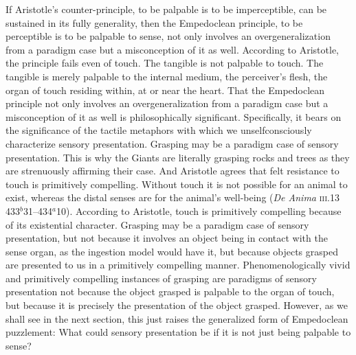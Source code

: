 If Aristotle's counter-principle, to be palpable is to be imperceptible, can be sustained in its fully generality, then the Empedoclean principle, to be perceptible is to be palpable to sense, not only involves an overgeneralization from a paradigm case but a misconception of it as well. According to Aristotle, the principle fails even of touch. The tangible is not palpable to touch. The tangible is merely palpable to the internal medium, the perceiver's flesh, the organ of touch residing within, at or near the heart. That the Empedoclean principle not only involves an overgeneralization from a paradigm case but a misconception of it as well is philosophically significant. Specifically, it bears on the significance of the tactile metaphors with which we unselfconsciously characterize sensory presentation. Grasping may be a paradigm case of sensory presentation. This is why the Giants are literally grasping rocks and trees as they are strenuously affirming their case. And Aristotle agrees that felt resistance to touch is primitively compelling. Without touch it is not possible for an animal to exist, whereas the distal senses are for the animal's well-being (\emph{De Anima} \textsc{iii}.13 433\( ^{b} \)31--434\( ^{a} \)10). According to Aristotle, touch is primitively compelling because of its existential character. Grasping may be a paradigm case of sensory presentation, but not because it involves an object being in contact with the sense organ, as the ingestion model would have it, but because objects grasped are presented to us in a primitively compelling manner. Phenomenologically vivid and primitively compelling instances of grasping are paradigms of sensory presentation not because the object grasped is palpable to the organ of touch, but because it is precisely the presentation of the object grasped. However, as we shall see in the next section, this just raises the generalized form of Empedoclean puzzlement: What could sensory presentation be if it is not just being palpable to sense?

